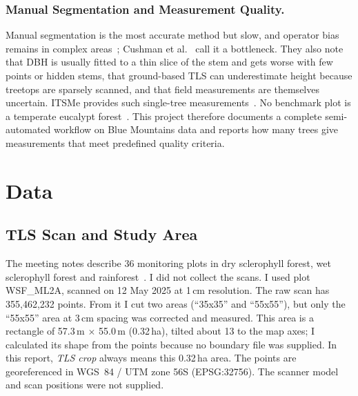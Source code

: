\documentclass[runningheads]{llncs}
\begin{document}
\subsubsection{Manual Segmentation and Measurement Quality.}
Manual segmentation is the most accurate method but slow, and operator bias remains in complex areas~\cite{cherlet2026}; Cushman et al.~\cite{cushman2026} call it a bottleneck. They also note that DBH is usually fitted to a thin slice of the stem and gets worse with few points or hidden stems, that ground-based TLS can underestimate height because treetops are sparsely scanned, and that field measurements are themselves uncertain. ITSMe provides such single-tree measurements~\cite{terryn2023}. No benchmark plot is a temperate eucalypt forest~\cite{cherlet2026}. This project therefore documents a complete semi-automated workflow on Blue Mountains data and reports how many trees give measurements that meet predefined quality criteria.

\section{Data}\label{sec:data}

\subsection{TLS Scan and Study Area}\label{sec:tls}
The meeting notes describe 36 monitoring plots in dry sclerophyll forest, wet sclerophyll forest and rainforest~\cite{meetingnotes}. I did not collect the scans. I used plot WSF\_ML2A, scanned on 12 May 2025 at 1\,cm resolution. The raw scan has 355,462,232 points. From it I cut two areas (``35x35'' and ``55x55''), but only the ``55x55'' area at 3\,cm spacing was corrected and measured. This area is a rectangle of 57.3\,m $\times$ 55.0\,m (0.32\,ha), tilted about 13\textdegree{} to the map axes; I calculated its shape from the points because no boundary file was supplied. In this report, \emph{TLS crop} always means this 0.32\,ha area. The points are georeferenced in WGS~84 / UTM zone 56S (EPSG:32756). The scanner model and scan positions were not supplied.
\end{document}
